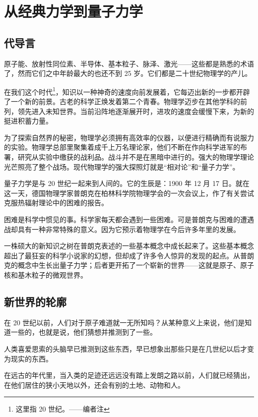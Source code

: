\chapter{从经典力学到量子力学}

\section{代导言}

原子能、放射性同位素、半导体、基本粒子、脉泽、激光——这些都是熟悉的术语了，然而它们之中年龄最大的也还不到 25 岁。它们都是二十世纪物理学的产儿。

在我们这个时代\footnote{这里指 20 世纪。——编者注}，知识以一种神奇的速度向前发展着，它每迈出新的一步都开辟了一个新的前景。古老的科学正焕发着第二个青春。物理学迈步在其他学科的前列，领先进入未知世界。当前沿阵地逐渐展开时，进攻的速度会缓慢下来，为新的挺进积蓄力量。

为了探索自然界的秘密，物理学必须拥有高效率的仪器，以便进行精确而有说服力的实验。物理学总部里聚集着成千上万名理论家，他们不断在作向科学进军的布署，研究从实验中缴获的战利品。战斗并不是在黑暗中进行的。强大的物理学理论光芒照亮了整个战场。现代物理学的强大探照灯就是“相对论”和“量子力学”。

量子力学是与 20 世纪一起来到人间的。它的生辰是：1900 年 12 月 17 日。就在这一天，德国物理学家普朗克在柏林科学院物理学会的一次会议上，作了有关尝试克服热辐射理论中的困难的报告。

困难是科学中惯见的事。科学家每天都会遇到一些困难。可是普朗克与困难的遭遇战却具有一种非常特殊的意义。因为它预示着物理学在今后许多年里的发展。

一株硕大的新知识之树在普朗克表述的一些基本概念中成长起来了。这些基本概念超出了最狂妄的科学小说家的幻想，但却成了许多令人惊异的发现的起点。从普朗克的概念中生长出量子力学；后者更开拓了一个崭新的世界——这就是原子、原子核和基木粒子的微观世界。

\section{新世界的轮廓}

在 20 世纪以前，人们对于原子难道就一无所知吗？从某种意义上来说，他们是知道一些的，也就是说，他们猜想并推测到了一些。

人类喜爱思索的头脑早已推测到这些东西，早已想象出那些只是在几世纪以后才变为现实的东西。

在远古的年代里，当入类的足迹还远远没有踏上发朗之路以前，人们就已经猜出，在他们居住的狭小天地以外，还会有别的土地、动物和人。

